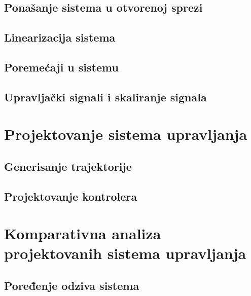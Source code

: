 \documentclass[a4paper,11pt]{article}
\theoremstyle{definition} \newtheorem{deff}{Definicija}[section]
\theoremstyle{definition} \newtheorem{prim}[deff]{Primer}
\theoremstyle{plain} \newtheorem{teor}[deff]{Teorema}
\begin{document}
	
	
	
	
	
	\clearpage
	
	
	\subsection{Ponašanje sistema u otvorenoj sprezi}
	
	
	
	\clearpage 
	\subsection{Linearizacija sistema}
	
	
	
	\clearpage
	\subsection{Poremećaji u sistemu}
	
	
	
	
	\clearpage
	\subsection{Upravljački signali i skaliranje signala}
	
	
	
	
	\newpage
	
	
	
	\section{Projektovanje sistema upravljanja}
	
	
	\newpage
	\subsection{Generisanje trajektorije}
	
	
	\newpage
	\subsection{Projektovanje kontrolera}
	
	
	
	\newpage
	
	\section{Komparativna analiza projektovanih sistema upravljanja}
	
	\subsection{Poređenje odziva sistema}
\end{document}
